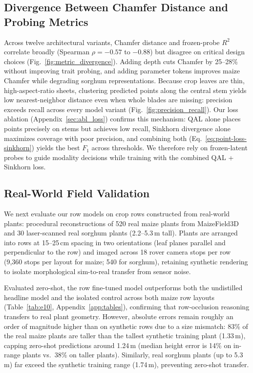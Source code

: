 \documentclass[10pt,twocolumn,letterpaper]{article}
\begin{document}
\subsection{Divergence Between Chamfer Distance and Probing Metrics}
\label{sec:res-metrics}\label{sec:exp-metrics}

Across twelve architectural variants, Chamfer distance and frozen-probe $R^2$ correlate broadly (Spearman $\rho = -0.57$ to $-0.88$) but disagree on critical design choices (Fig.~\ref{fig:metric_divergence}). Adding depth cuts Chamfer by 25--28\% without improving trait probing, and adding parameter tokens improves maize Chamfer while degrading sorghum representations. Because crop leaves are thin, high-aspect-ratio sheets, clustering predicted points along the central stem yields low nearest-neighbor distance even when whole blades are missing: precision exceeds recall across every model variant (Fig.~\ref{fig:precision_recall}). Our loss ablation (Appendix~\ref{sec:abl_loss}) confirms this mechanism: QAL alone places points precisely on stems but achieves low recall, Sinkhorn divergence alone maximizes coverage with poor precision, and combining both (Eq.~\ref{eq:point-loss-sinkhorn}) yields the best $F_1$ across thresholds. We therefore rely on frozen-latent probes to guide modality decisions while training with the combined QAL + Sinkhorn loss.

\subsection{Real-World Field Validation}
\label{sec:res-field}\label{sec:exp-real}

We next evaluate our row models on crop rows constructed from real-world plants: procedural reconstructions of 520 real maize plants from MaizeField3D~\citep{maizefield3d2025,hadadi2026vlmmaize} and 30 laser-scanned real sorghum plants (2.2--5.3\,m tall). Plants are arranged into rows at 15--25\,cm spacing in two orientations (leaf planes parallel and perpendicular to the row) and imaged across 18 rover camera stops per row (9{,}360 stops per layout for maize; 540 for sorghum), retaining synthetic rendering to isolate morphological sim-to-real transfer from sensor noise.

Evaluated zero-shot, the row fine-tuned model outperforms both the undistilled headline model and the isolated control across both maize row layouts (Table~\ref{tab:e10}, Appendix~\ref{app:tables}), confirming that row-occlusion reasoning transfers to real plant geometry. However, absolute errors remain roughly an order of magnitude higher than on synthetic rows due to a size mismatch: 83\% of the real maize plants are taller than the tallest synthetic training plant (1.33\,m), capping zero-shot predictions around 1.24\,m (median height error is 14\% on in-range plants vs.\ 38\% on taller plants). Similarly, real sorghum plants (up to 5.3\,m) far exceed the synthetic training range (1.74\,m), preventing zero-shot transfer.
\end{document}
